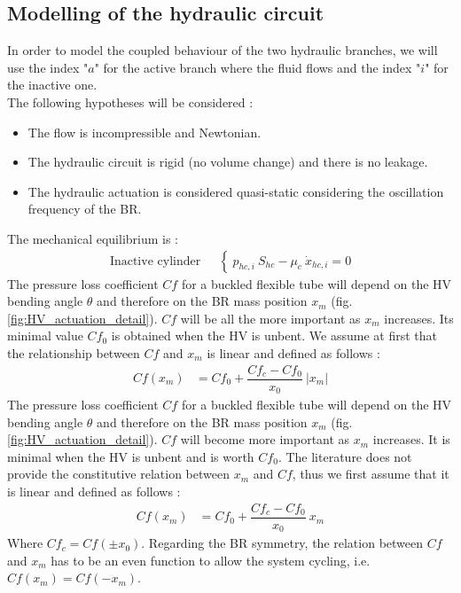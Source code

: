 \documentclass[3p,twocolumn,preprint]{elsarticle}
\begin{document}
	\subsection{Modelling of the hydraulic circuit}	
	\label{subsec:The hydraulic circuit}
In order to model the coupled behaviour of the two hydraulic branches, we will use the index "$a$" for the active branch where the fluid flows and the index "$i$" for the inactive one. \\
The following hypotheses will be considered :
\begin{itemize}
	\item The flow is incompressible and Newtonian.
	\item The hydraulic circuit is rigid (no volume change) and there is no leakage.
	\item The hydraulic actuation is considered quasi-static considering the oscillation frequency of the BR.
\end{itemize}
The mechanical equilibrium is :
\begin{align}
	\text{Inactive cylinder ~}& \left\{~
	p_{hc,i}\ S_{hc} - \mu_{c}\ \dot{x}_{hc,i} = 0
	\right.
	\label{eq:equilibre_dynamique_piston_ferme}
\end{align}
The pressure loss coefficient $Cf$ for a buckled flexible tube will depend on the HV bending angle $\theta$ and therefore on the BR mass position $x_m$ (fig. \ref{fig:HV_actuation_detail}). $Cf$ will be all the more important as $x_m$ increases. Its minimal value $Cf_0$ is obtained when the HV is unbent. We assume at first that the relationship between $Cf$ and $x_m$ is linear and defined as follows :
\begin{align}
Cf(x_m) & = Cf_0 + \dfrac{Cf_c - Cf_0}{x_0}\ |x_m| 
\label{eq:Cf(x_m)_linear}
\end{align}
The pressure loss coefficient $Cf$ for a buckled flexible tube will depend on the HV bending angle $\theta$ and therefore on the BR mass position $x_m$ (fig. \ref{fig:HV_actuation_detail}). $Cf$ will become more important as $x_m$ increases. It is minimal when the HV is unbent and is worth $Cf_0$. The literature does not provide the constitutive relation between $x_m$ and $Cf$, thus we first assume that it is linear and defined as follows :
\begin{align}
Cf(x_m) & = Cf_0 + \dfrac{Cf_c - Cf_0}{x_0}\ x_m 
\label{eq:Cf(x_m)_linear}
\end{align}
Where $Cf_c=Cf(\pm x_0)$. Regarding the BR symmetry, the relation between $Cf$ and $x_m$ has to be an even function to allow the system cycling, i.e. $Cf(x_m) = Cf(-x_m)$.
\end{document}
